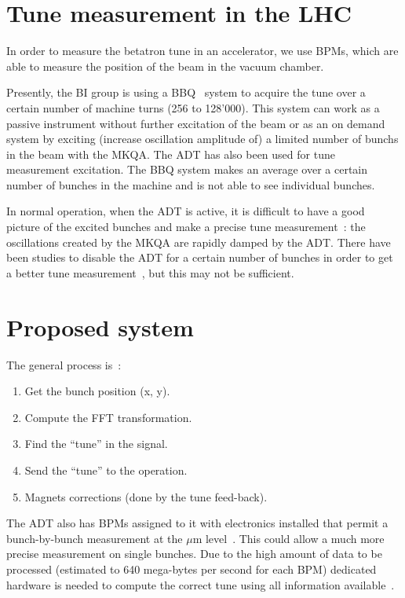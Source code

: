 \section{Tune measurement in the LHC}

In order to measure the betatron tune in an accelerator, we use
\glspl{BPM}, which are able to measure the position of the beam in the
vacuum chamber.

Presently, the \gls{BI} group is using a \gls{BBQ}~\cite{Boccardi:1156349} system to acquire the tune over a certain number of machine turns (256 to 128'000). This system can work as a passive instrument without further excitation of the beam or as an on demand system by exciting (increase oscillation amplitude of) a limited number of \glspl{bunch} in the beam with the \gls{MKQA}. The \Gls{ADT} has also been used for tune measurement excitation\cite{HofleEvian10}. The \gls{BBQ} system makes an average over a certain number of bunches in the machine and is not able to see individual bunches.

In normal operation, when the \gls{ADT} is active, it is difficult to have a good picture of the excited bunches and make a precise tune measurement~: the oscillations created by the \gls{MKQA} are rapidly damped by the \gls{ADT}. There have been studies to disable the \gls{ADT} for a certain number of bunches in order to get a better tune measurement~\cite{HofleEvian11}, but this may not be sufficient.

\section{Proposed system}

The general process is~:
\begin{enumerate}
\item Get the bunch position (x, y).
\item Compute the \gls{FFT} transformation.
\item Find the ``tune'' in the signal.
\item Send the ``tune'' to the operation.
\item Magnets corrections (done by the tune feed-back).
\end{enumerate}

The \gls{ADT} also has \glspl{BPM} assigned to it with electronics installed that permit a bunch-by-bunch measurement at the $\mu$m level~\cite{BphMeas07}. This could allow a much more precise measurement on single bunches. Due to the high amount of data to be processed (estimated to 640 mega-bytes per second for each \gls{BPM}) dedicated hardware is needed to compute the correct tune using all information available~\cite{HofleChamonix12}.

